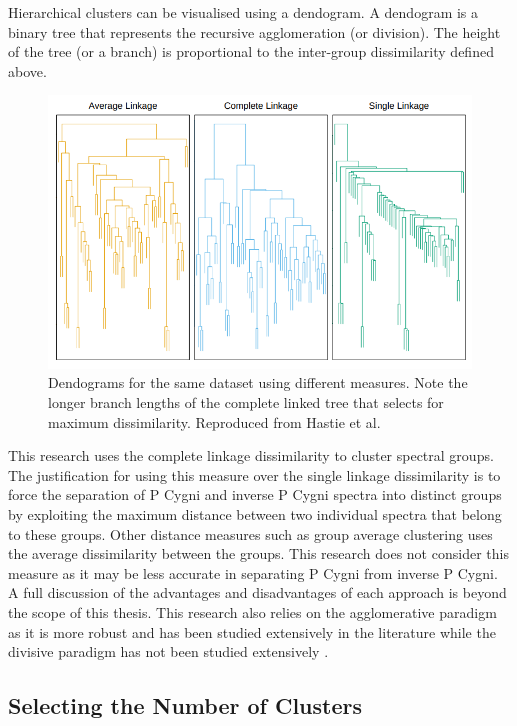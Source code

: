 Hierarchical clusters can be visualised using a dendogram. A dendogram is a binary tree that represents the recursive agglomeration (or division). The height of the tree (or a branch) is proportional to the inter-group dissimilarity defined above. 

\begin{figure}[h]
\centering
\includegraphics[scale=0.60]{figures/complete linkage.png}
\caption{Dendograms for the same dataset using different measures. Note the longer branch lengths of the complete linked tree that selects for maximum dissimilarity. Reproduced from Hastie et al.\cite{hastie2009elements}}
\end{figure}

This research uses the complete linkage dissimilarity to cluster spectral groups. The justification for using this measure over the single linkage dissimilarity is to force the separation of P Cygni and inverse P Cygni spectra into distinct groups by exploiting the maximum distance between two individual spectra that belong to these groups. Other distance measures such as group average clustering uses the average dissimilarity between the groups. This research does not consider this measure as it may be less accurate in separating P Cygni from inverse P Cygni. A full discussion of the advantages and disadvantages of each approach is beyond the scope of this thesis. This research also relies on the agglomerative paradigm as it is more robust and has been studied extensively in the literature while the divisive paradigm has not been studied extensively \cite{hastie2009elements}.


\subsection{Selecting the Number of Clusters}

